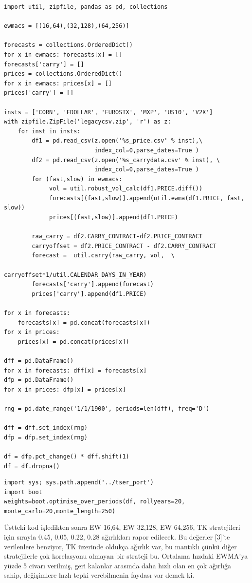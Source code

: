 \documentclass[12pt,fleqn]{article}\usepackage{../../common}
\begin{document}
\begin{verbatim}
import util, zipfile, pandas as pd, collections

ewmacs = [(16,64),(32,128),(64,256)]

forecasts = collections.OrderedDict()
for x in ewmacs: forecasts[x] = []
forecasts['carry'] = []
prices = collections.OrderedDict()
for x in ewmacs: prices[x] = []
prices['carry'] = []

insts = ['CORN', 'EDOLLAR', 'EUROSTX', 'MXP', 'US10', 'V2X']
with zipfile.ZipFile('legacycsv.zip', 'r') as z:
    for inst in insts: 
        df1 = pd.read_csv(z.open('%s_price.csv' % inst),\
                          index_col=0,parse_dates=True )     
        df2 = pd.read_csv(z.open('%s_carrydata.csv' % inst), \
                          index_col=0,parse_dates=True )     
        for (fast,slow) in ewmacs:
             vol = util.robust_vol_calc(df1.PRICE.diff())
             forecasts[(fast,slow)].append(util.ewma(df1.PRICE, fast, slow))
             prices[(fast,slow)].append(df1.PRICE)

        raw_carry = df2.CARRY_CONTRACT-df2.PRICE_CONTRACT
        carryoffset = df2.PRICE_CONTRACT - df2.CARRY_CONTRACT
        forecast =  util.carry(raw_carry, vol,  \
                               carryoffset*1/util.CALENDAR_DAYS_IN_YEAR)
        forecasts['carry'].append(forecast)
        prices['carry'].append(df1.PRICE)
    
for x in forecasts:
    forecasts[x] = pd.concat(forecasts[x])
for x in prices:
    prices[x] = pd.concat(prices[x])
    
dff = pd.DataFrame()
for x in forecasts: dff[x] = forecasts[x]
dfp = pd.DataFrame()
for x in prices: dfp[x] = prices[x]

rng = pd.date_range('1/1/1900', periods=len(dff), freq='D')

dff = dff.set_index(rng)
dfp = dfp.set_index(rng)

df = dfp.pct_change() * dff.shift(1)
df = df.dropna()
\end{verbatim}

\begin{verbatim}
import sys; sys.path.append('../tser_port')
import boot
weights=boot.optimise_over_periods(df, rollyears=20, monte_carlo=20,monte_length=250)
\end{verbatim}

Üstteki kod işledikten sonra EW 16,64, EW 32,128, EW 64,256, TK stratejileri
için sırayla 0.45, 0.05, 0.22, 0.28 ağırlıkları rapor edilecek. Bu değerler
[3]'te verilenlere benziyor, TK üzerinde oldukça ağırlık var, bu mantıklı
çünkü diğer stratejilerle çok korelasyonu olmayan bir strateji bu. Ortalama
hızdaki EWMA'ya yüzde 5 civarı verilmiş, geri kalanlar arasında daha hızlı
olan en çok ağırlığa sahip, değişimlere hızlı tepki verebilmenin faydası var
demek ki.
\end{document}

